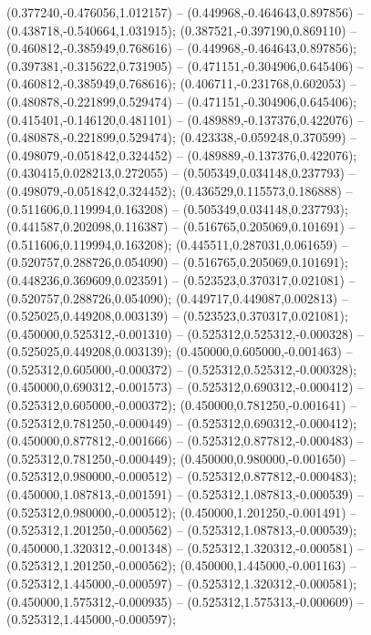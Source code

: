  (0.377240,-0.476056,1.012157) -- (0.449968,-0.464643,0.897856) -- (0.438718,-0.540664,1.031915);
 (0.387521,-0.397190,0.869110) -- (0.460812,-0.385949,0.768616) -- (0.449968,-0.464643,0.897856);
 (0.397381,-0.315622,0.731905) -- (0.471151,-0.304906,0.645406) -- (0.460812,-0.385949,0.768616);
 (0.406711,-0.231768,0.602053) -- (0.480878,-0.221899,0.529474) -- (0.471151,-0.304906,0.645406);
 (0.415401,-0.146120,0.481101) -- (0.489889,-0.137376,0.422076) -- (0.480878,-0.221899,0.529474);
 (0.423338,-0.059248,0.370599) -- (0.498079,-0.051842,0.324452) -- (0.489889,-0.137376,0.422076);
 (0.430415,0.028213,0.272055) -- (0.505349,0.034148,0.237793) -- (0.498079,-0.051842,0.324452);
 (0.436529,0.115573,0.186888) -- (0.511606,0.119994,0.163208) -- (0.505349,0.034148,0.237793);
 (0.441587,0.202098,0.116387) -- (0.516765,0.205069,0.101691) -- (0.511606,0.119994,0.163208);
 (0.445511,0.287031,0.061659) -- (0.520757,0.288726,0.054090) -- (0.516765,0.205069,0.101691);
 (0.448236,0.369609,0.023591) -- (0.523523,0.370317,0.021081) -- (0.520757,0.288726,0.054090);
 (0.449717,0.449087,0.002813) -- (0.525025,0.449208,0.003139) -- (0.523523,0.370317,0.021081);
 (0.450000,0.525312,-0.001310) -- (0.525312,0.525312,-0.000328) -- (0.525025,0.449208,0.003139);
 (0.450000,0.605000,-0.001463) -- (0.525312,0.605000,-0.000372) -- (0.525312,0.525312,-0.000328);
 (0.450000,0.690312,-0.001573) -- (0.525312,0.690312,-0.000412) -- (0.525312,0.605000,-0.000372);
 (0.450000,0.781250,-0.001641) -- (0.525312,0.781250,-0.000449) -- (0.525312,0.690312,-0.000412);
 (0.450000,0.877812,-0.001666) -- (0.525312,0.877812,-0.000483) -- (0.525312,0.781250,-0.000449);
 (0.450000,0.980000,-0.001650) -- (0.525312,0.980000,-0.000512) -- (0.525312,0.877812,-0.000483);
 (0.450000,1.087813,-0.001591) -- (0.525312,1.087813,-0.000539) -- (0.525312,0.980000,-0.000512);
 (0.450000,1.201250,-0.001491) -- (0.525312,1.201250,-0.000562) -- (0.525312,1.087813,-0.000539);
 (0.450000,1.320312,-0.001348) -- (0.525312,1.320312,-0.000581) -- (0.525312,1.201250,-0.000562);
 (0.450000,1.445000,-0.001163) -- (0.525312,1.445000,-0.000597) -- (0.525312,1.320312,-0.000581);
 (0.450000,1.575312,-0.000935) -- (0.525312,1.575313,-0.000609) -- (0.525312,1.445000,-0.000597);
